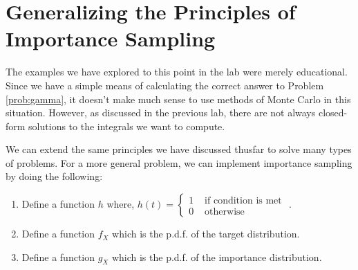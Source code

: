 \section*{Generalizing the Principles of Importance Sampling}
The examples we have explored to this point in the lab were merely educational. Since we have a simple means of calculating the correct answer to Problem \ref{prob:gamma}, it doesn't make much sense to use methods of Monte Carlo in this situation. However, as discussed in the previous lab, there are not always closed-form solutions to the integrals we want to compute.

We can extend the same principles we have discussed thusfar to solve many types of problems. For a more general problem, we can implement importance sampling by doing the following:
\begin{enumerate}
\item Define a function $h$ where, $h(t) = \begin{cases}
1 & \text{ if condition is met }  \\ 
0 & \text{ otherwise}
\end{cases} $.  
\item Define a function $f_X$ which is the p.d.f. of the target distribution. 
\item Define a function $g_X$ which is the p.d.f. of the importance distribution.
\end{enumerate}


